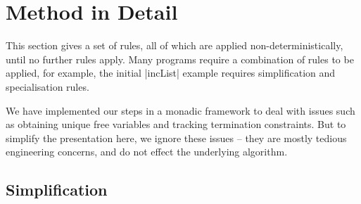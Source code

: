 \documentclass[preprint]{sigplanconf}
\begin{document}
\section{Method in Detail}
\label{sec:detailed}

\begin{comment}
\begin{code}
data Prog = Prog deriving Eq
simplify,arity,inline,specialise :: Prog -> Prog
\end{code}
\end{comment}

This section gives a set of rules, all of which are applied non-deterministically, until no further rules apply. Many programs require a combination of rules to be applied, for example, the initial |incList| example requires simplification and specialisation rules.

We have implemented our steps in a monadic framework to deal with issues such as obtaining unique free variables and tracking termination constraints. But to simplify the presentation here, we ignore these issues -- they are mostly tedious engineering concerns, and do not effect the underlying algorithm.

\subsection{Simplification}
\label{sec:simplification_detail}
\end{document}
